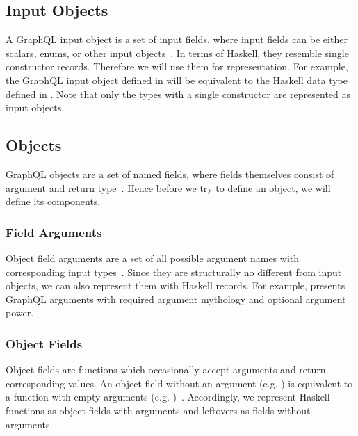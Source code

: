 
\subsection{Input Objects}

A GraphQL input object is a set of input fields, 
where input fields can be either 
scalars, enums, or other input objects~\cite{gql-spec}. 
In terms of Haskell, they resemble single constructor records. 
Therefore we will use them for representation. 
For example, the GraphQL input object  defined in  will be equivalent to the Haskell data type   defined in . 
Note that only the types with a single constructor 
are represented as input objects.


\subsection{Objects}
\label{sec:map:objects}

GraphQL objects are a set of named fields, where fields themselves consist of argument and return type~\cite{gql-spec}. Hence before we try to define an object, we will define its components.

\subsubsection{Field Arguments}

Object field arguments are a set of all possible argument names with corresponding input types~\cite{gql-spec}. Since they are structurally no different from input objects, we can also represent them with Haskell records. For example,  presents GraphQL arguments with required argument mythology and optional argument power. 


\subsubsection{Object Fields}

Object fields are functions which occasionally accept arguments and return corresponding values. An object field without an argument (e.g. ) is equivalent to a function with empty arguments (e.g. )~\cite{gql-spec}.
Accordingly, we represent Haskell functions as object fields with arguments and leftovers as fields without arguments. 

